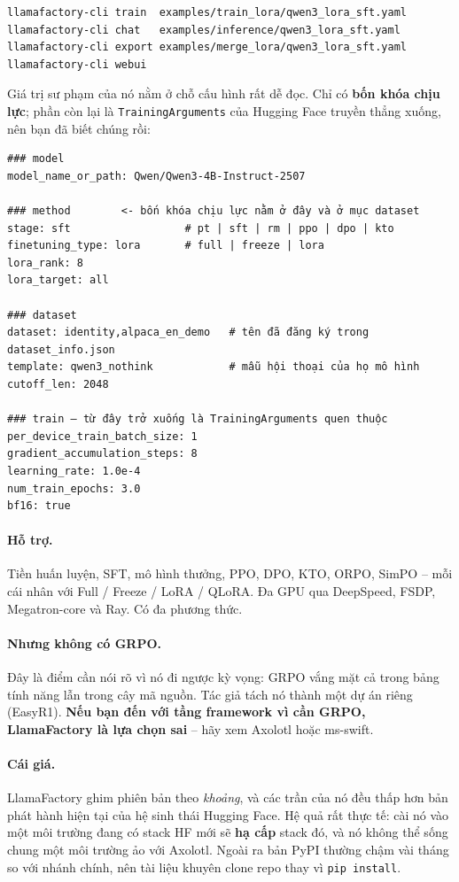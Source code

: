 \begin{verbatim}
llamafactory-cli train  examples/train_lora/qwen3_lora_sft.yaml
llamafactory-cli chat   examples/inference/qwen3_lora_sft.yaml
llamafactory-cli export examples/merge_lora/qwen3_lora_sft.yaml
llamafactory-cli webui
\end{verbatim}

\noindent Giá trị sư phạm của nó nằm ở chỗ cấu hình rất dễ đọc. Chỉ có \textbf{bốn khóa chịu lực}; phần còn lại là \texttt{TrainingArguments} của Hugging Face truyền thẳng xuống, nên bạn đã biết chúng rồi:

\begin{verbatim}
### model
model_name_or_path: Qwen/Qwen3-4B-Instruct-2507

### method        <- bốn khóa chịu lực nằm ở đây và ở mục dataset
stage: sft                  # pt | sft | rm | ppo | dpo | kto
finetuning_type: lora       # full | freeze | lora
lora_rank: 8
lora_target: all

### dataset
dataset: identity,alpaca_en_demo   # tên đã đăng ký trong dataset_info.json
template: qwen3_nothink            # mẫu hội thoại của họ mô hình
cutoff_len: 2048

### train — từ đây trở xuống là TrainingArguments quen thuộc
per_device_train_batch_size: 1
gradient_accumulation_steps: 8
learning_rate: 1.0e-4
num_train_epochs: 3.0
bf16: true
\end{verbatim}

\paragraph{Hỗ trợ.} Tiền huấn luyện, SFT, mô hình thưởng, PPO, DPO, KTO, ORPO, SimPO -- mỗi cái nhân với Full / Freeze / LoRA / QLoRA. Đa GPU qua DeepSpeed, FSDP, Megatron-core và Ray. Có đa phương thức.

\paragraph{Nhưng không có GRPO.} Đây là điểm cần nói rõ vì nó đi ngược kỳ vọng: GRPO vắng mặt cả trong bảng tính năng lẫn trong cây mã nguồn. Tác giả tách nó thành một dự án riêng (EasyR1). \textbf{Nếu bạn đến với tầng framework vì cần GRPO, LlamaFactory là lựa chọn sai} -- hãy xem Axolotl hoặc ms-swift.

\paragraph{Cái giá.} LlamaFactory ghim phiên bản theo \emph{khoảng}, và các trần của nó đều thấp hơn bản phát hành hiện tại của hệ sinh thái Hugging Face. Hệ quả rất thực tế: cài nó vào một môi trường đang có stack HF mới sẽ \textbf{hạ cấp} stack đó, và nó không thể sống chung một môi trường ảo với Axolotl. Ngoài ra bản PyPI thường chậm vài tháng so với nhánh chính, nên tài liệu khuyên clone repo thay vì \texttt{pip install}.

